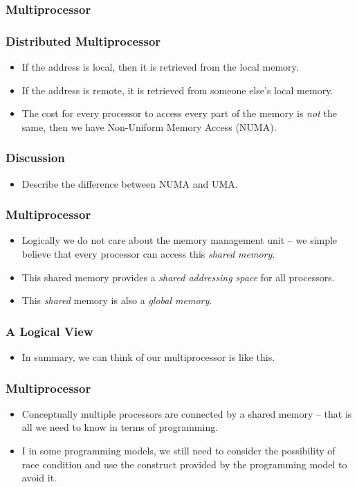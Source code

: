 \documentclass{beamer}
\begin{document}
\begin{CJK}{UTF8}{bsmi}
\begin{frame}
\frametitle{Multiprocessor}
\centerline{}
\end{frame}

\begin{frame}
\frametitle{Distributed Multiprocessor}
\begin{itemize}
\item If the address is local, then it is retrieved from the
  local memory.
\item If the address is remote, it is retrieved from someone else's local memory.
\item The cost for every processor to access every part of the memory
  is {\em not} the same, then we have Non-Uniform Memory Access
  (NUMA).
\end{itemize}
\end{frame}

\begin{frame}
\frametitle{Discussion}
\begin{itemize}
\item Describe the difference between NUMA and UMA.
\end{itemize}
\end{frame}

\begin{frame}
\frametitle{Multiprocessor}
\begin{itemize}
\item Logically we do not care about the memory management unit -- we
  simple believe that every processor can access this {\em shared
    memory}.
\item This shared memory provides a {\em shared addressing space} for
  all processors.
\item This {\em shared} memory is also a {\em global memory}.
\end{itemize}
\end{frame}


\begin{frame}
\frametitle{A Logical View}
\begin{itemize}
\item In summary, we can think of our multiprocessor is like this.
\end{itemize}
\centerline{}
\end{frame}

\begin{frame}
\frametitle{Multiprocessor}
\begin{itemize}
\item Conceptually multiple processors are connected by a shared
  memory -- that is all we need to know in terms of programming.
\item I in some programming models, we still need to consider the possibility of race condition and use the construct provided by the programming model to avoid it.
\end{itemize}
\end{frame}


\end{CJK}
\end{document}
